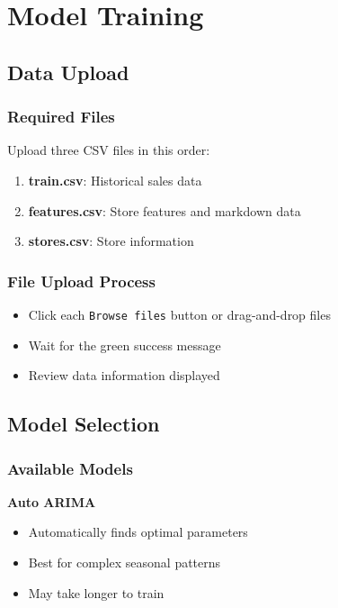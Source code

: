\chapter{Model Training}

\section{Data Upload}

\subsection{Required Files}
Upload three CSV files in this order:
\begin{enumerate}
	\item \textbf{train.csv}: Historical sales data
	\item \textbf{features.csv}: Store features and markdown data
	\item \textbf{stores.csv}: Store information
\end{enumerate}

\subsection{File Upload Process}
\begin{itemize}
	\item Click each \texttt{Browse files} button or drag-and-drop files
	\item Wait for the green success message
	\item Review data information displayed
\end{itemize}

\section{Model Selection}

\subsection{Available Models}

\textbf{Auto ARIMA}
\begin{itemize}
	\item Automatically finds optimal parameters
	\item Best for complex seasonal patterns
	\item May take longer to train
\end{itemize}

